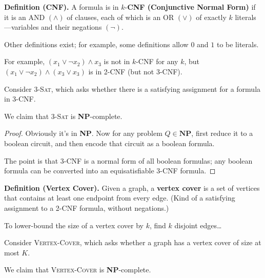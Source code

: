 \textbf{Definition (CNF).} A formula is in $k$-\textbf{CNF (Conjunctive Normal Form)} if it is an AND $(\wedge)$ of clauses, each of which is an OR $(\vee)$ of exactly $k$ literals---variables and their negations $(\neg)$.

\begin{remark}
    Other definitions exist; for example, some definitions allow $0$ and $1$ to be literals.
\end{remark}

For example, $(x_1 \vee \neg x_2) \wedge x_3$ is not in $k$-CNF for any $k$, but $(x_1 \vee \neg x_2) \wedge (x_3 \vee x_3)$ is in 2-CNF (but not 3-CNF).

\begin{claim}
    Consider \textsc{3-Sat}, which asks whether there is a satisfying assignment for a formula in 3-CNF.

    We claim that \textsc{3-Sat} is \textbf{NP}-complete.
\end{claim}

\begin{proof}
    Obviously it's in \textbf{NP}.  Now for any problem $Q \in \textbf{NP}$, first reduce it to a boolean circuit, and then encode that circuit as a boolean formula.

    The point is that 3-CNF is a normal form of all boolean formulas; any boolean formula can be converted into an equisatisfiable 3-CNF formula.
\end{proof}

\textbf{Definition (Vertex Cover).} Given a graph, a \textbf{vertex cover} is a set of vertices that contains at least one endpoint from every edge.  (Kind of a satisfying assignment to a 2-CNF formula, without negations.)

\begin{remark}
    To lower-bound the size of a vertex cover by $k$, find $k$ disjoint edges\dots
\end{remark}

\begin{claim}
    Consider \textsc{Vertex-Cover}, which asks whether a graph has a vertex cover of size at most $K$.

    We claim that \textsc{Vertex-Cover} is \textbf{NP}-complete.
\end{claim}

